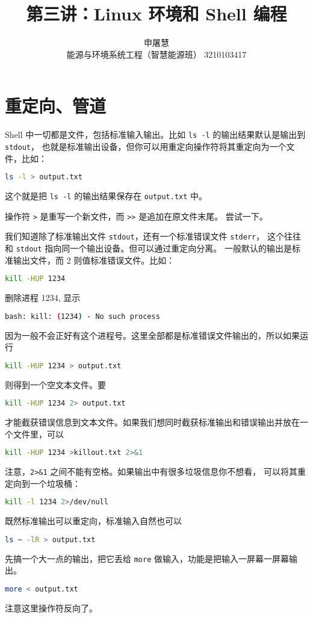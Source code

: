 \documentclass[a4paper]{ctexart}
\title{第三讲：Linux 环境和 Shell 编程}
\author{申屠慧 \\ 能源与环境系统工程（智慧能源班） 3210103417}
\date{}
\begin{document}
\maketitle
\pagestyle{empty}

\section{重定向、管道}

Shell 中一切都是文件，包括标准输入输出。比如 \verb|ls -l| 的输出结果默认是输出到 \verb|stdout|，
也就是标准输出设备，但你可以用重定向操作符将其重定向为一个文件，比如：
\begin{lstlisting}[language=sh]
ls -l > output.txt
\end{lstlisting}

这个就是把 \verb|ls -l| 的输出结果保存在 \verb|output.txt| 中。 

操作符 \verb|>| 是重写一个新文件，而 \verb|>>| 是追加在原文件末尾。
尝试一下。

我们知道除了标准输出文件 \verb|stdout|，还有一个标准错误文件 \verb|stderr|，
这个往往和 \verb|stdout| 指向同一个输出设备。但可以通过重定向分离。
一般默认的输出是标准输出文件，而 2 则值标准错误文件。比如：
\begin{lstlisting}[language=sh]
kill -HUP 1234
\end{lstlisting}
删除进程 1234, 显示
\begin{lstlisting}[language=sh]
bash: kill: (1234) - No such process
\end{lstlisting}
因为一般不会正好有这个进程号。这里全部都是标准错误文件输出的，所以如果运行
\begin{lstlisting}[language=sh]
kill -HUP 1234 > output.txt
\end{lstlisting}
则得到一个空文本文件。要
\begin{lstlisting}[language=sh]
kill -HUP 1234 2> output.txt
\end{lstlisting}
才能截获错误信息到文本文件。如果我们想同时截获标准输出和错误输出并放在一个文件里，可以
\begin{lstlisting}[language=sh]
kill -HUP 1234 >killout.txt 2>&1
\end{lstlisting}
注意，\verb|2>&1| 之间不能有空格。如果输出中有很多垃圾信息你不想看，
可以将其重定向到一个垃圾桶：
\begin{lstlisting}[language=sh]
kill -l 1234 2>/dev/null
\end{lstlisting}

既然标准输出可以重定向，标准输入自然也可以
\begin{lstlisting}[language=sh]
ls ~ -lR > output.txt
\end{lstlisting}
先搞一个大一点的输出，把它丢给 \verb|more| 做输入，功能是把输入一屏幕一屏幕输出。
\begin{lstlisting}[language=sh]
more < output.txt
\end{lstlisting}
注意这里操作符反向了。
\end{document}
